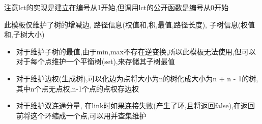 注意lct的实现是建立在编号从1开始,但调用lct的公开函数是编号从0开始

此模板仅维护了树的增减边, 路径信息(权值和,积,最值,路径长度), 子树信息(权值和,子树大小)

\begin{itemize}
    \item 对于维护子树的最值,由于min,max不存在逆变换,所以此模板无法使用,但可以对于每个点维护一个平衡树(set),来存储其子树最值
    \item 对于维护边权(生成树),可以化边为点将大小为n的树化成大小为n + n - 1的树,其中n个点无点权,n-1个点的点权存边权
    \item 对于维护双连通分量, 在link时如果连接失败(产生了环,且将返回false),在返回前将这个环缩成一个点,可以用并查集维护
\end{itemize}